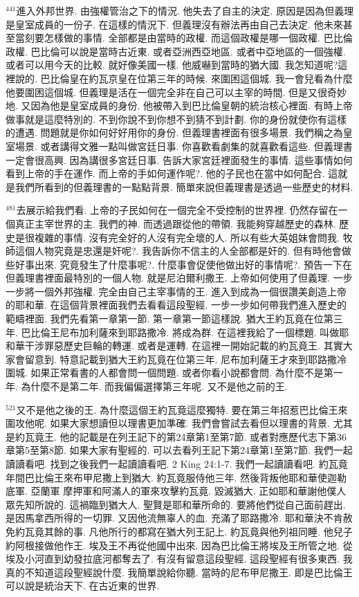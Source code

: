 \documentclass{book}
\begin{document}
$^{441}$進入外邦世界.
由強權管治之下的情況.
他失去了自主的決定.
原因是因為但義理是皇室成員的一份子.
在這樣的情況下.
但義理沒有辦法再由自己去決定.
他未來甚至當刻要怎樣做的事情.
全部都是由當時的政權.
而這個政權是哪一個政權.
巴比倫政權.
巴比倫可以說是當時古近東.
或者亞洲西亞地區.
或者中亞地區的一個強權.
或者可以用今天的比較.
就好像美國一樣.
他威嚇到當時的猶大國.
我怎知道呢?這裡說的.
巴比倫皇在約瓦京皇在位第三年的時候.
來圍困這個城.
我一會兒看為什麼他要圍困這個城.
但義理是活在一個完全非在自己可以主宰的時間.
但是又很奇妙地.
又因為他是皇室成員的身份.
他被帶入到巴比倫皇朝的統治核心裡面.
有時上帝做事就是這麼特別的.
不到你說不到你想不到猜不到計劃.
你的身份就使你有這樣的遭遇.
問題就是你如何好好用你的身份.
但義理書裡面有很多場景.
我們稱之為皇室場景.
或者講得文雅一點叫做宮廷日事.
你喜歡看劇集的就喜歡看這些.
但義理書一定會很高興.
因為講很多宮廷日事.
告訴大家宮廷裡面發生的事情.
這些事情如何看到上帝的手在運作.
而上帝的手如何運作呢?.
他的子民也在當中如何配合.
這就是我們所看到的但義理書的一點點背景.
簡單來說但義理書是透過一些歷史的材料.

$^{481}$去展示給我們看.
上帝的子民如何在一個完全不受控制的世界裡.
仍然存留在一個真正主宰世界的主.
我們的神.
而透過跟從他的帶領.
我能夠穿越歷史的森林.
歷史是很複雜的事情.
沒有完全好的人沒有完全壞的人.
所以有些大英姐妹會問我.
牧師這個人物究竟是忠還是奸呢?.
我告訴你不信主的人全部都是奸的.
但有時他會做些好事出來.
究竟發生了什麼事呢?.
什麼事會促使他做出好的事情呢?.
預告一下在但義理書裡面最特別的一個人物.
就是尼泊爾利撒王.
上帝如何使用了但義理.
一步一步將一個外邦強權.
完全由自己主宰事情的王.
進入到成為一個很讚美創造上帝的耶和華.
在這個背景裡面我們去看看這段聖經.
一步一步如何帶我們進入歷史的範疇裡面.
我們先看第一章第一節.
第一章第一節這樣說.
猶大王約瓦竟在位第三年.
巴比倫王尼布加利薩來到耶路撒冷.
將成為群.
在這裡我給了一個標題.
叫做耶和華干涉罪惡歷史巨輪的轉運.
或者是運轉.
在這裡一開始記載的約瓦竟王.
其實大家會留意到.
特意記載到猶大王約瓦竟在位第三年.
尼布加利薩王才來到耶路撒冷圍城.
如果正常看書的人都會問一個問題.
或者你看小說都會問.
為什麼不是第一年.
為什麼不是第二年.
而我偏偏選擇第三年呢.
又不是他之前的王.

$^{521}$又不是他之後的王.
為什麼這個王約瓦竟這麼獨特.
要在第三年招惹巴比倫王來圍攻他呢.
如果大家想讀但以理書更加準確.
我們會嘗試去看但以理書的背景.
尤其是約瓦竟王.
他的記載是在列王記下的第24章第1至第7節.
或者對應歷代志下第36章第5至第8節.
如果大家有聖經的.
可以去看列王記下第24章第1至第7節.
我們一起讀讀看吧.
找到之後我們一起讀讀看吧.
2 King 24:1-7.
我們一起讀讀看吧.
約瓦竟年間巴比倫王來布甲尼撒上到猶大.
約瓦竟服侍他三年.
然後背叛他耶和華使迦勒底軍.
亞蘭軍 摩押軍和阿滿人的軍來攻擊約瓦竟.
毀滅猶大.
正如耶和華謝他僕人眾先知所說的.
這禍臨到猶大人.
聖賢是耶和華所命的.
要將他們從自己面前趕出.
是因馬拿西所得的一切罪.
又因他流無辜人的血.
充滿了耶路撒冷.
耶和華決不肯赦免約瓦竟其餘的事.
凡他所行的都寫在猶大列王記上.
約瓦竟與他列祖同睡.
他兒子約阿根接做他作王.
埃及王不再從他國中出來.
因為巴比倫王將埃及王所管之地.
從埃及小河直到幼發拉底河都奪去了.
有沒有留意這段聖經.
這段聖經有很多東西.
我真的不知道這段聖經說什麼.
我簡單說給你聽.
當時的尼布甲尼撒王.
即是巴比倫王可以說是統治天下.
在古近東的世界.
\end{document}

